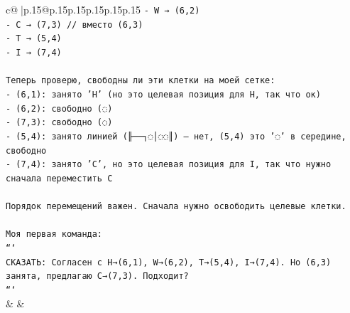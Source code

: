 \documentclass{article}
\begin{document}
{\begin{supertabular}{c@{$\;$}|p{.15\linewidth}@{}p{.15\linewidth}p{.15\linewidth}p{.15\linewidth}p{.15\linewidth}p{.15\linewidth}}
{{{\texttt{{-} W → (6,2)} \\
\texttt{{-} C → (7,3)  // вместо (6,3)} \\
\texttt{{-} T → (5,4)} \\
\texttt{{-} I → (7,4)} \\
\\ 
\texttt{Теперь проверю, свободны ли эти клетки на моей сетке:} \\
\texttt{{-} (6,1): занято 'H' (но это целевая позиция для H, так что ок)} \\
\texttt{{-} (6,2): свободно (◌)} \\
\texttt{{-} (7,3): свободно (◌)} \\
\texttt{{-} (5,4): занято линией (╟──┐◌│◌◌║) — нет, (5,4) это '◌' в середине, свободно} \\
\texttt{{-} (7,4): занято 'C', но это целевая позиция для I, так что нужно сначала переместить C} \\
\\ 
\texttt{Порядок перемещений важен. Сначала нужно освободить целевые клетки.} \\
\\ 
\texttt{Моя первая команда:} \\
\texttt{```} \\
\texttt{СКАЗАТЬ: Согласен с H→(6,1), W→(6,2), T→(5,4), I→(7,4). Но (6,3) занята, предлагаю C→(7,3). Подходит?} \\
\texttt{```} \\
            }
        }
    }
    & & \\ \\


\end{supertabular}}
\end{document}
